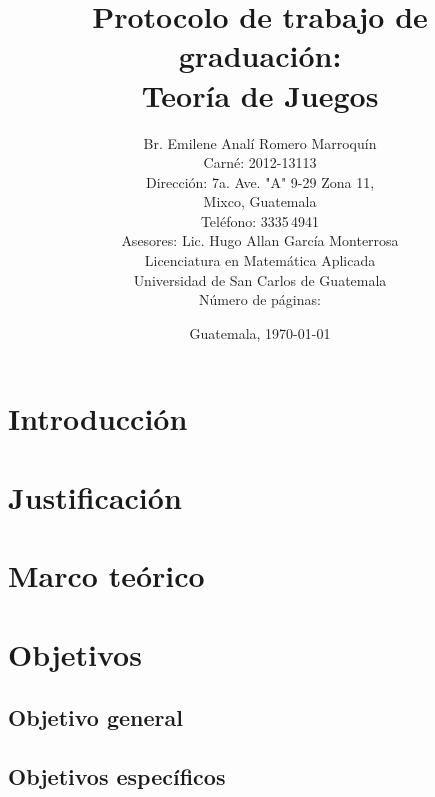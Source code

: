 \documentclass[12pt,letterpaper,titlepage]{article}
\title{Protocolo de trabajo de graduación:\\
Teoría de Juegos}
\author{Br. Emilene Analí Romero Marroquín\\Carné: 2012-13113\\Dirección: 7a. Ave. "A" 9-29 Zona 11,\\Mixco, Guatemala\\Teléfono: 3335\,4941\\Asesores: Lic. Hugo Allan García Monterrosa\\Licenciatura en Matemática Aplicada\\Universidad de San Carlos de Guatemala\\Número de páginas: \pageref{fin}}
\date{Guatemala, \today}
\begin{document}
\maketitle
\setcounter{page}{2}
\tableofcontents

\newpage

\section{Introducción}


\newpage

\section{Justificación}





\newpage

\section{Marco teórico}


\newpage

\section{Objetivos}


\subsection{Objetivo general}


\subsection{Objetivos específicos}
\end{document}
